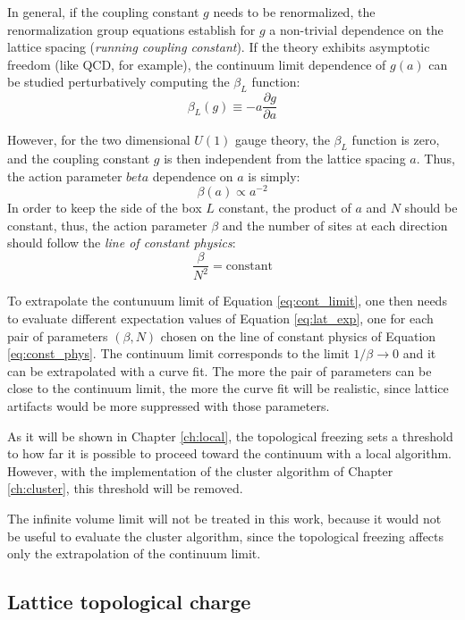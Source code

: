 In general, if the coupling constant $g$ needs to be renormalized,
the renormalization group equations establish for $g$ a non-trivial dependence on the lattice spacing (\emph{running coupling constant}).
If the theory exhibits asymptotic freedom (like QCD, for example), the continuum limit dependence of $g(a)$ can be studied perturbatively computing the $\beta_L$ function:
\[
    \beta_L(g) \equiv -a\frac{\partial g}{\partial a}
\]

However, for the two dimensional $U(1)$ gauge theory, the $\beta_L$ function is zero, and the coupling constant $g$ is then independent from the lattice spacing $a$.
Thus, the action parameter $beta$ dependence on $a$ is simply:
\[
    \beta(a) \propto a^{-2}
\]
In order to keep the side of the box $L$ constant, the product of $a$ and $N$ should be constant,
thus, the action parameter $\beta$ and the number of sites at each direction should follow the \emph{line of constant physics}:
\begin{equation}\label{eq:const_phys}
    \frac{\beta}{N^2} = \text{constant}
\end{equation}

To extrapolate the contunuum limit of Equation \eqref{eq:cont_limit},
one then needs to evaluate different expectation values of Equation \eqref{eq:lat_exp},
one for each pair of parameters $(\beta,N)$ chosen on the line of constant physics of Equation \eqref{eq:const_phys}.
The continuum limit corresponds to the limit $1/\beta\to0$ and it can be extrapolated with a curve fit.
The more the pair of parameters can be close to the continuum limit, the more the curve fit will be realistic,
since lattice artifacts would be more suppressed with those parameters. 

As it will be shown in Chapter \ref{ch:local}, the topological freezing sets a threshold to how far it is possible to proceed toward the continuum with a local algorithm.
However, with the implementation of the cluster algorithm of Chapter \ref{ch:cluster}, this threshold will be removed.

The infinite volume limit will not be treated in this work,
because it would not be useful to evaluate the cluster algorithm,
since the topological freezing affects only the extrapolation of the continuum limit.

\subsection*{Lattice topological charge}










